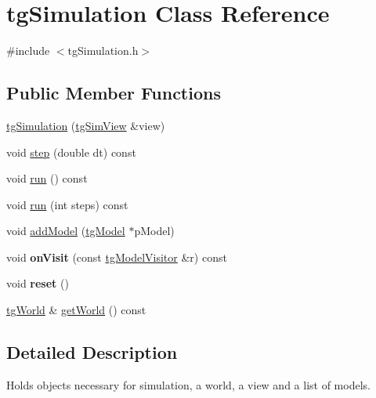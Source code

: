 \hypertarget{classtg_simulation}{\section{tg\-Simulation Class Reference}
\label{classtg_simulation}
}


{\ttfamily \#include $<$tg\-Simulation.\-h$>$}

\subsection*{Public Member Functions}
\begin{DoxyCompactItemize}
\item 
\hyperlink{classtg_simulation_aebf9c10f57d7c67350a90b7b46affbcf}{tg\-Simulation} (\hyperlink{classtg_sim_view}{tg\-Sim\-View} \&view)
\item 
void \hyperlink{classtg_simulation_a1e1b937fa359a501ab7ddd415b229c33}{step} (double dt) const 
\item 
void \hyperlink{classtg_simulation_ad2b39f98f266911bf37c09319dce6c24}{run} () const 
\item 
void \hyperlink{classtg_simulation_aee97eee2bd59defdb36ef34715b8abb9}{run} (int steps) const 
\item 
void \hyperlink{classtg_simulation_a23caf4331a3006bdc9df595756c0cc5c}{add\-Model} (\hyperlink{classtg_model}{tg\-Model} $\ast$p\-Model)
\item 
\hypertarget{classtg_simulation_a543a38ceef0cf33d57087a23864d9f15}{void {\bfseries on\-Visit} (const \hyperlink{classtg_model_visitor}{tg\-Model\-Visitor} \&r) const }\label{classtg_simulation_a543a38ceef0cf33d57087a23864d9f15}

\item 
\hypertarget{classtg_simulation_a456e2f62d48204859e6b7da4ea52279f}{void {\bfseries reset} ()}\label{classtg_simulation_a456e2f62d48204859e6b7da4ea52279f}

\item 
\hyperlink{classtg_world}{tg\-World} \& \hyperlink{classtg_simulation_aaaba2fee70633115cdea3727c7cd7842}{get\-World} () const 
\end{DoxyCompactItemize}


\subsection{Detailed Description}
Holds objects necessary for simulation, a world, a view and a list of models. 

